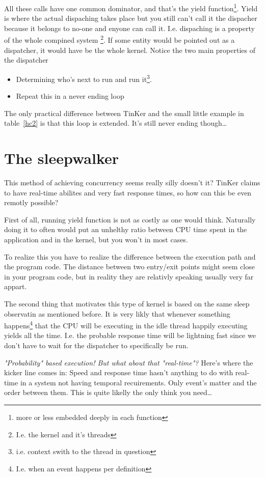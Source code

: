 All these calls have one common dominator, and that's the yield function\footnote{more or less embedded deeply in each function}. Yield is where the actual dispaching takes place but you still can't call it the dispacher because it belongs to no-one and enyone can call it. I.e. dispaching is a property of the whole compined system \footnote{I.e. the kernel and it's threads}. If some entity would be pointed out as a dispatcher, it would have be the whole kernel. Notice the two main properties of the dispatcher
\begin{itemize}
	\item Determining who's next to run and run it\footnote{i.e. context swith to the thread in question}.
	\item Repeat this in a never ending loop
\end{itemize}
The only practical difference between TinKer and the small little example in table~\ref{hc2} is that this loop is extended. It's still never ending though\ldots

\section{The sleepwalker}
This method of achieving concurrency seems really silly doesn't it? TinKer claims to have real-time abilites and very fast response times, so how can this be even remotly possible?

First of all, running yield function is not as costly as one would think. Naturally doing it to often would put an unhelthy ratio between CPU time spent in the application and in the kernel, but you won't in most cases.

To realize this you have to realize the difference between the execution path and the program code. The distance between two entry/exit points might seem close in your program code, but in reality they are relativly speaking usually very far appart.

The second thing that motivates this type of kernel is based on the same sleep observatin as mentioned before. It is very likly that whenever something happens\footnote{I.e. when an event happens per definition} that the CPU will be executing in the idle thread happily executing yields all the time. I.e. the probable response time will be lightning fast since we don't have to wait for the dispatcher to specifically be run.

\textit{\textit{"Probability"} based execution! But what about that \textit{"real-time"}?} Here's where the kicker line comes in: Speed and response time hasn't anything to do with real-time in a system not having temporal recuirements. Only event's matter and the order between them. This is quite likelly the only think you need\ldots

